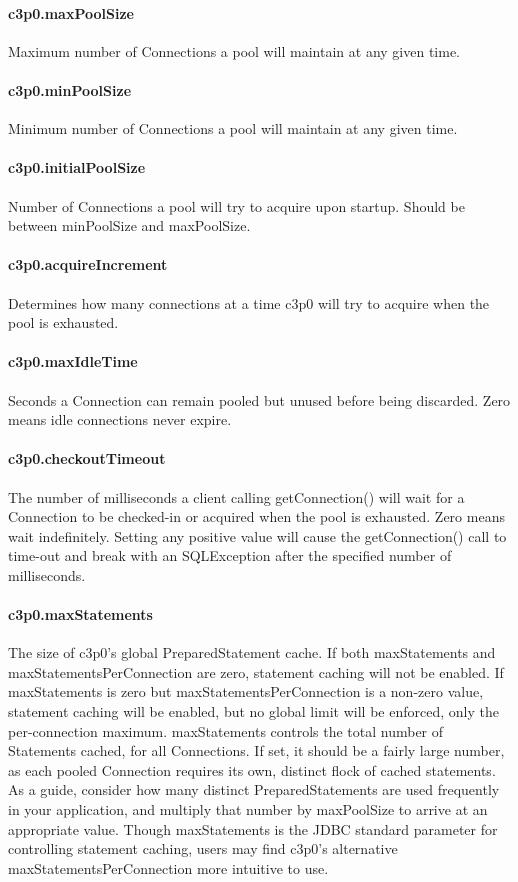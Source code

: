 \documentclass[12pt,a4paper]{report}
\begin{document}
\paragraph{c3p0.maxPoolSize}
Maximum number of Connections a pool will maintain at any given time.

\paragraph{c3p0.minPoolSize}
Minimum number of Connections a pool will maintain at any given time.

\paragraph{c3p0.initialPoolSize}
Number of Connections a pool will try to acquire upon startup. Should be between minPoolSize and maxPoolSize.

\paragraph{c3p0.acquireIncrement}
Determines how many connections at a time c3p0 will try to acquire when the pool is exhausted.

\paragraph{c3p0.maxIdleTime}
Seconds a Connection can remain pooled but unused before being discarded. Zero means idle connections never expire.

\paragraph{c3p0.checkoutTimeout}
The number of milliseconds a client calling getConnection() will wait for a Connection to be checked-in or acquired when the pool is exhausted. Zero means wait indefinitely. Setting any positive value will cause the getConnection() call to time-out and break with an SQLException after the specified number of milliseconds.

\paragraph{c3p0.maxStatements}
The size of c3p0's global PreparedStatement cache. If both maxStatements and maxStatementsPerConnection are zero, statement caching will not be enabled. If maxStatements is zero but maxStatementsPerConnection is a non-zero value, statement caching will be enabled, but no global limit will be enforced, only the per-connection maximum. maxStatements controls the total number of Statements cached, for all Connections. If set, it should be a fairly large number, as each pooled Connection requires its own, distinct flock of cached statements. As a guide, consider how many distinct PreparedStatements are used frequently in your application, and multiply that number by maxPoolSize to arrive at an appropriate value. Though maxStatements is the JDBC standard parameter for controlling statement caching, users may find c3p0's alternative maxStatementsPerConnection more intuitive to use. 
\end{document}
